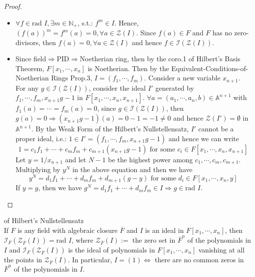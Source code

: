 \begin{proof}
    \begin{itemize}
        \item $\forall f\in \text{rad }I, \exists m\in \mathbb{N}_+$, s.t.: $f^m \in I$. Hence, $(f(a))^m= f^m (a)=0, \forall a \in \mathcal{Z} (I)$. Since $f(a) \in F$ and $F$ has no zero-divisors, then $f(a)=0, \forall a\in \mathcal{Z} (I)$ and hence $f\in \mathcal{I} ( \mathcal{Z} (I))$.

        \item Since field$\Rightarrow$PID$\Rightarrow$Noetherian ring, then by the coro.1 of Hilbert's Basis Theorem, $F[x_1 ,\cdots, x_n]$ is Noetherian. Then by the Equivalent-Conditions-of-Noetherian Rings Prop.3, $I= (f_1 ,\cdots, f_m)$. Consider a new variable $x_{n+1}$. For any $g\in \mathcal{I} (\mathcal{Z} (I))$, consider the ideal $I'$ generated by $f_1 ,\cdots, f_m, x_{n+1}g-1$ in $F[x_1 ,\cdots, x_n ,x_{n+1}]$. $\forall a= (a_1 ,\cdots, a_n,b) \in \mathbb{A}^{n+1}$ with $f_1(a)= \cdots= f_m(a)=0$, since $g \in \mathcal{I} (\mathcal{Z} (I))$, then $g(a)=0 \Rightarrow (x_{n+1}g-1) (a)=0-1= -1 \neq 0$ and hence $\mathcal{Z} (I')= \emptyset$ in $\mathbb{A}^{n+1}$. By the Weak Form of the Hilbert's Nullstellensatz, $I'$ cannot be a proper ideal, i.e.: $1 \in I'= (f_1 ,\cdots, f_m ,x_{n+1}g-1)$ and hence we can write
        \[
        1= c_1f_1 +\cdots+ c_mf_m+c_{m+1} (x_{n+1}g-1) \text{ for some } c_i \in F[x_1 ,\cdots, x_n,x_{n+1}]
        \]
        Let $y=1/x_{n+1}$ and let $N-1$ be the highest power among $c_1 ,\cdots, c_m, c_{m+1}$. Multiplying by $y^N$ in the above equation and then we have
        \[
        y^N= d_1f_1 +\cdots+ d_mf_m+ d_{m+1}(g-y) \text{ for some } d_i\in F[x_1 ,\cdots, x_n,y]
        \]
        If $y=g$, then we have $g^N= d_1f_1+ \cdots+ d_mf_m \in I \Rightarrow g\in \text{rad }I$.
    \end{itemize}
\end{proof}

\begin{corollary}{of Hilbert's Nullstellensatz}\\
If $F$ is any field with algebraic closure $\overline{F}$ and $I$ is an ideal in $F[x_1 ,\cdots, x_n]$, then $\mathcal{I}_F (\mathcal{Z}_{\overline{F}} (I)) =\text{rad }I$, where $\mathcal{Z}_{\overline{F}} (I):=$ the zero set in $\overline{F}^n$ of the polynomials in $I$ and $\mathcal{I}_F( \mathcal{Z}_{\overline{F}} (I))$ is the ideal of polynomials in $F[x_1 ,\cdots, x_n]$ vanishing at all the points in $\mathcal{Z}_{\overline{F}} (I)$. In particular, $I=(1) \Leftrightarrow$ there are no common zeros in $\overline{F}^n$ of the polynomials in $I$.
\end{corollary}

